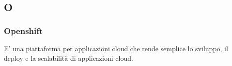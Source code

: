 \subsection*{\textbf{\hfill \Huge{O} \hfill}} 
\subsubsection*{Openshift}
E' una piattaforma per applicazioni cloud che rende semplice lo sviluppo, il deploy e la scalabilità di applicazioni cloud.